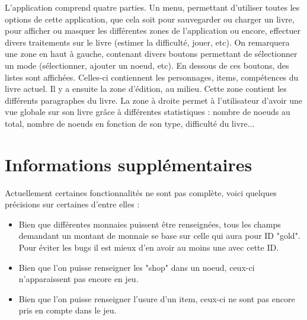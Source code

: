 		L'application comprend quatre parties. Un menu, permettant d'utiliser toutes les options de cette application, que cela soit pour sauvegarder ou charger un livre, pour afficher ou masquer les différentes zones de l'application ou encore, effectuer divers traitements sur le livre (estimer la difficulté, jouer, etc). On remarquera une zone en haut à gauche, contenant divers boutons permettant de sélectionner un mode (sélectionner, ajouter un noeud, etc). En dessous de ces boutons, des listes sont affichées. Celles-ci contiennent les personnages, items, compétences du livre actuel. Il y a ensuite la zone d'édition, au milieu. Cette zone contient les différents paragraphes du livre. La zone à droite permet à l'utilisateur d'avoir une vue globale sur son livre grâce à différentes statistiques : nombre de noeuds au total, nombre de noeuds en fonction de son type, difficulté du livre...

	\section{Informations supplémentaires}

		Actuellement certaines fonctionnalités ne sont pas complète, voici quelques précisions sur certaines d'entre elles :

		\begin{itemize}
			\item{Bien que différentes monnaies puissent être renseignées, tous les champs demandant un montant de monnaie se base sur celle qui aura pour ID "gold". Pour éviter les bugs il est mieux d'en avoir au moins une avec cette ID.}
			\item{Bien que l'on puisse renseigner les "shop" dans un noeud, ceux-ci n'apparaissent pas encore en jeu.}
			\item{Bien que l'on puisse renseigner l'usure d'un item, ceux-ci ne sont pas encore pris en compte dans le jeu.}
		\end{itemize}
